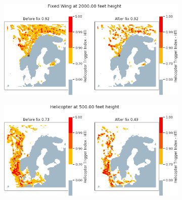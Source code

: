 \begin{figure}[H]
    \begin{subfigure}{0.45\textwidth}
    \centering
    \includegraphics[width=\textwidth]{Figures/12.png}
    \caption{}
    \label{fig:HTI12}
    \end{subfigure}
\hfill
    \begin{subfigure}{0.45\textwidth}
    \centering
    \includegraphics[width=\textwidth]{Figures/21.png}
    \caption{}
    \label{fig:HTI21}
    \end{subfigure}


\end{figure}
